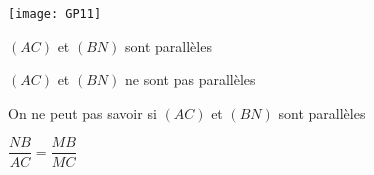 \begin{QCM}
\begin{GroupeQCM}
\begin{exercice}

\texttt{[image: GP11]}
\begin{ChoixQCM}{4}
\item $(AC)$ et $(BN)$ sont parallèles
\item $(AC)$ et $(BN)$ ne sont pas parallèles
\item On ne peut pas savoir si $(AC)$ 
et $(BN)$ sont parallèles
\item $\dfrac{NB}{AC}=\dfrac{MB}{MC}$
\end{ChoixQCM}
\begin{corrige}
\end{corrige}
\end{exercice}


\end{GroupeQCM}
\end{QCM}
